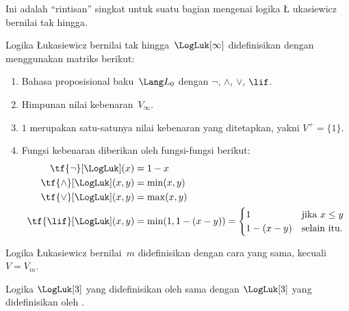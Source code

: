 \documentclass[../../../include/open-logic-section]{subfiles}
\begin{document}


\begin{editorial}
  Ini adalah ``rintisan'' singkat untuk suatu bagian mengenai logika \L
  ukasiewicz bernilai tak hingga.
\end{editorial}

\begin{defn} Logika \L ukasiewicz bernilai tak
hingga~$\LogLuk[\infty]$ didefinisikan dengan menggunakan matriks berikut:
\begin{enumerate}
  \item Bahasa proposisional baku~$\Lang L_0$ dengan
  $\lnot$, $\land$, $\lor$, $\lif$.
  \item Himpunan nilai kebenaran~$V_\infty$.
  \item $1$ merupakan satu-satunya nilai kebenaran yang ditetapkan, yakni
  $V^+ = \{1\}$.
  \item Fungsi kebenaran diberikan oleh fungsi-fungsi berikut:
  \begin{align*}
    \tf{\lnot}[\LogLuk](x) & = 1 - x\\
    \tf{\land}[\LogLuk](x,y) & = \min(x,y)\\
    \tf{\lor}[\LogLuk](x,y) & = \max(x,y)\\
    \tf{\lif}[\LogLuk](x,y) & = \min(1,1-(x-y)) = \begin{cases}
      1 & \text{jika } x \le y\\
      1-(x-y) & \text{selain itu.}
    \end{cases}
    \end{align*}
\end{enumerate}
Logika \L ukasiewicz bernilai~$m$ didefinisikan dengan cara yang sama,
kecuali $V = V_m$.
\end{defn}

\begin{prop}
  Logika $\LogLuk[3]$ yang didefinisikan oleh
   sama dengan $\LogLuk[3]$ yang
  didefinisikan oleh .
\end{prop}
\end{document}
